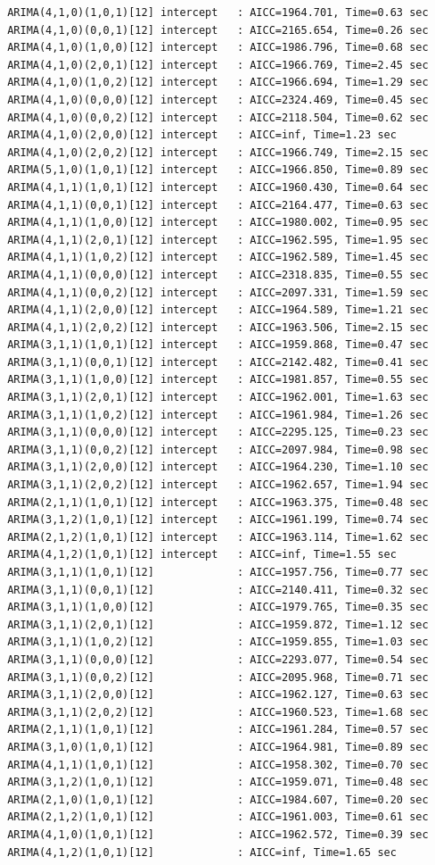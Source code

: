 \documentclass[a4paper, 12pt]{article}
\begin{document}
\begin{verbatim}
 ARIMA(4,1,0)(1,0,1)[12] intercept   : AICC=1964.701, Time=0.63 sec
 ARIMA(4,1,0)(0,0,1)[12] intercept   : AICC=2165.654, Time=0.26 sec
 ARIMA(4,1,0)(1,0,0)[12] intercept   : AICC=1986.796, Time=0.68 sec
 ARIMA(4,1,0)(2,0,1)[12] intercept   : AICC=1966.769, Time=2.45 sec
 ARIMA(4,1,0)(1,0,2)[12] intercept   : AICC=1966.694, Time=1.29 sec
 ARIMA(4,1,0)(0,0,0)[12] intercept   : AICC=2324.469, Time=0.45 sec
 ARIMA(4,1,0)(0,0,2)[12] intercept   : AICC=2118.504, Time=0.62 sec
 ARIMA(4,1,0)(2,0,0)[12] intercept   : AICC=inf, Time=1.23 sec
 ARIMA(4,1,0)(2,0,2)[12] intercept   : AICC=1966.749, Time=2.15 sec
 ARIMA(5,1,0)(1,0,1)[12] intercept   : AICC=1966.850, Time=0.89 sec
 ARIMA(4,1,1)(1,0,1)[12] intercept   : AICC=1960.430, Time=0.64 sec
 ARIMA(4,1,1)(0,0,1)[12] intercept   : AICC=2164.477, Time=0.63 sec
 ARIMA(4,1,1)(1,0,0)[12] intercept   : AICC=1980.002, Time=0.95 sec
 ARIMA(4,1,1)(2,0,1)[12] intercept   : AICC=1962.595, Time=1.95 sec
 ARIMA(4,1,1)(1,0,2)[12] intercept   : AICC=1962.589, Time=1.45 sec
 ARIMA(4,1,1)(0,0,0)[12] intercept   : AICC=2318.835, Time=0.55 sec
 ARIMA(4,1,1)(0,0,2)[12] intercept   : AICC=2097.331, Time=1.59 sec
 ARIMA(4,1,1)(2,0,0)[12] intercept   : AICC=1964.589, Time=1.21 sec
 ARIMA(4,1,1)(2,0,2)[12] intercept   : AICC=1963.506, Time=2.15 sec
 ARIMA(3,1,1)(1,0,1)[12] intercept   : AICC=1959.868, Time=0.47 sec
 ARIMA(3,1,1)(0,0,1)[12] intercept   : AICC=2142.482, Time=0.41 sec
 ARIMA(3,1,1)(1,0,0)[12] intercept   : AICC=1981.857, Time=0.55 sec
 ARIMA(3,1,1)(2,0,1)[12] intercept   : AICC=1962.001, Time=1.63 sec
 ARIMA(3,1,1)(1,0,2)[12] intercept   : AICC=1961.984, Time=1.26 sec
 ARIMA(3,1,1)(0,0,0)[12] intercept   : AICC=2295.125, Time=0.23 sec
 ARIMA(3,1,1)(0,0,2)[12] intercept   : AICC=2097.984, Time=0.98 sec
 ARIMA(3,1,1)(2,0,0)[12] intercept   : AICC=1964.230, Time=1.10 sec
 ARIMA(3,1,1)(2,0,2)[12] intercept   : AICC=1962.657, Time=1.94 sec
 ARIMA(2,1,1)(1,0,1)[12] intercept   : AICC=1963.375, Time=0.48 sec
 ARIMA(3,1,2)(1,0,1)[12] intercept   : AICC=1961.199, Time=0.74 sec
 ARIMA(2,1,2)(1,0,1)[12] intercept   : AICC=1963.114, Time=1.62 sec
 ARIMA(4,1,2)(1,0,1)[12] intercept   : AICC=inf, Time=1.55 sec
 ARIMA(3,1,1)(1,0,1)[12]             : AICC=1957.756, Time=0.77 sec
 ARIMA(3,1,1)(0,0,1)[12]             : AICC=2140.411, Time=0.32 sec
 ARIMA(3,1,1)(1,0,0)[12]             : AICC=1979.765, Time=0.35 sec
 ARIMA(3,1,1)(2,0,1)[12]             : AICC=1959.872, Time=1.12 sec
 ARIMA(3,1,1)(1,0,2)[12]             : AICC=1959.855, Time=1.03 sec
 ARIMA(3,1,1)(0,0,0)[12]             : AICC=2293.077, Time=0.54 sec
 ARIMA(3,1,1)(0,0,2)[12]             : AICC=2095.968, Time=0.71 sec
 ARIMA(3,1,1)(2,0,0)[12]             : AICC=1962.127, Time=0.63 sec
 ARIMA(3,1,1)(2,0,2)[12]             : AICC=1960.523, Time=1.68 sec
 ARIMA(2,1,1)(1,0,1)[12]             : AICC=1961.284, Time=0.57 sec
 ARIMA(3,1,0)(1,0,1)[12]             : AICC=1964.981, Time=0.89 sec
 ARIMA(4,1,1)(1,0,1)[12]             : AICC=1958.302, Time=0.70 sec
 ARIMA(3,1,2)(1,0,1)[12]             : AICC=1959.071, Time=0.48 sec
 ARIMA(2,1,0)(1,0,1)[12]             : AICC=1984.607, Time=0.20 sec
 ARIMA(2,1,2)(1,0,1)[12]             : AICC=1961.003, Time=0.61 sec
 ARIMA(4,1,0)(1,0,1)[12]             : AICC=1962.572, Time=0.39 sec
 ARIMA(4,1,2)(1,0,1)[12]             : AICC=inf, Time=1.65 sec


\end{verbatim}
\end{document}
